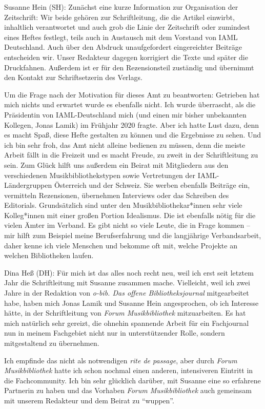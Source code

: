 \documentclass[a4paper,
fontsize=11pt,
oneside,
numbers=noperiodatend,
parskip=half-,
bibliography=totoc,
final
]{scrartcl}
\begin{document}
Susanne Hein (SH): Zunächst eine kurze Information zur Organisation der
Zeitschrift: Wir beide gehören zur Schriftleitung, die die Artikel
einwirbt, inhaltlich verantwortet und auch grob die Linie der
Zeitschrift oder zumindest eines Heftes festlegt, teils auch in
Austausch mit dem Vorstand von IAML Deutschland. Auch über den Abdruck
unaufgefordert eingereichter Beiträge entscheiden wir. Unser Redakteur
dagegen korrigiert die Texte und später die Druckfahnen. Außerdem ist er
für den Rezensionsteil zuständig und übernimmt den Kontakt zur
Schriftsetzerin des Verlags.

Um die Frage nach der Motivation für dieses Amt zu beantworten:
Getrieben hat mich nichts und erwartet wurde es ebenfalls nicht. Ich
wurde überrascht, als die Präsidentin von IAML-Deutschland mich (und
einen mir bisher unbekannten Kollegen, Jonas Lamik) im Frühjahr 2020
fragte. Aber ich hatte Lust dazu, denn es macht Spaß, diese Hefte
gestalten zu können und die Ergebnisse zu sehen. Und ich bin sehr froh,
das Amt nicht alleine bedienen zu müssen, denn die meiste Arbeit fällt
in die Freizeit und es macht Freude, zu zweit in der Schriftleitung zu
sein. Zum Glück hilft uns außerdem ein Beirat mit Mitgliedern aus den
verschiedenen Musikbibliothekstypen sowie Vertretungen der
IAML-Ländergruppen Österreich und der Schweiz. Sie werben ebenfalls
Beiträge ein, vermitteln Rezensionen, übernehmen Interviews oder das
Schreiben des Editorials. Grundsätzlich sind unter den
Musikbibliothekar*innen sehr viele Kolleg*innen mit einer großen Portion
Idealismus. Die ist ebenfalls nötig für die vielen Ämter im Verband. Es
gibt nicht so viele Leute, die in Frage kommen -- mir hilft zum Beispiel
meine Berufserfahrung und die langjährige Verbandsarbeit, daher kenne
ich viele Menschen und bekomme oft mit, welche Projekte an welchen
Bibliotheken laufen.

Dina Heß (DH): Für mich ist das alles noch recht neu, weil ich erst seit
letztem Jahr die Schriftleitung mit Susanne zusammen mache. Vielleicht,
weil ich zwei Jahre in der Redaktion von \emph{o-bib. Das offene
Bibliotheksjournal} mitgearbeitet habe, haben mich Jonas Lamik und
Susanne Hein angesprochen, ob ich Interesse hätte, in der Schriftleitung
von \emph{Forum Musikbibliothek} mitzuarbeiten. Es hat mich natürlich
sehr gereizt, die ohnehin spannende Arbeit für ein Fachjournal nun in
meinem Fachgebiet nicht nur in unterstützender Rolle, sondern
mitgestaltend zu übernehmen.

Ich empfinde das nicht als notwendigen \emph{rite de passage}, aber
durch \emph{Forum Musikbibliothek} hatte ich schon nochmal einen
anderen, intensiveren Eintritt in die Fachcommunity. Ich bin sehr
glücklich darüber, mit Susanne eine so erfahrene Partnerin zu haben und
das Vorhaben \emph{Forum Musikbibliothek} auch gemeinsam mit unserem
Redakteur und dem Beirat zu \enquote{wuppen}.
\end{document}
